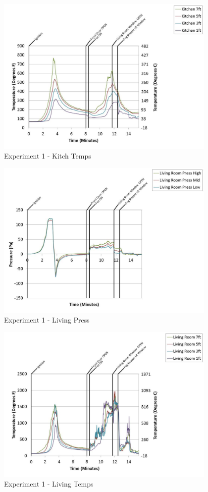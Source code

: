 \documentclass{article}
\begin{document}
\begin{appendices}
	\clearpage

	\begin{figure}[h!]
		\centering
		\includegraphics[height=3.05in]{0_Images/Results_Charts/Exp_1_Charts/KitchTemps.pdf}
		\caption{Experiment 1 - Kitch Temps}
	\end{figure}
 

	\begin{figure}[h!]
		\centering
		\includegraphics[height=3.05in]{0_Images/Results_Charts/Exp_1_Charts/LivingPress.pdf}
		\caption{Experiment 1 - Living Press}
	\end{figure}
 
	\clearpage

	\begin{figure}[h!]
		\centering
		\includegraphics[height=3.05in]{0_Images/Results_Charts/Exp_1_Charts/LivingTemps.pdf}
		\caption{Experiment 1 - Living Temps}
	\end{figure}
 


\end{appendices}
\end{document}
